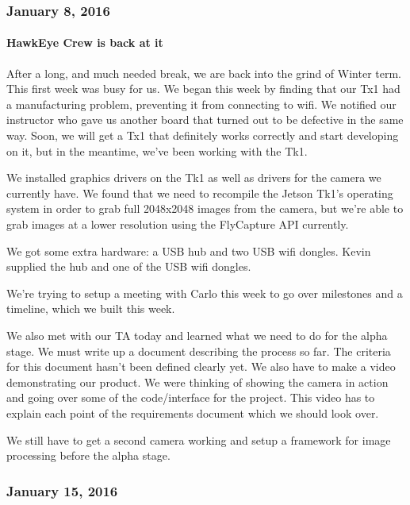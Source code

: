 \subsubsection{January 8, 2016}
\paragraph{HawkEye Crew is back at it}
After a long, and much needed break, we are back into the grind of Winter term. This first week was busy for us. We began this week by finding that our Tx1 had a manufacturing problem, preventing it from connecting to wifi. We notified our instructor who gave us another board that turned out to be defective in the same way. Soon, we will get a Tx1 that definitely works correctly and start developing on it, but in the meantime, we've been working with the Tk1.
\par
We installed graphics drivers on the Tk1 as well as drivers for the camera we currently have. We found that we need to recompile the Jetson Tk1's operating system in order to grab full 2048x2048 images from the camera, but we're able to grab images at a lower resolution using the FlyCapture API currently.
\par
We got some extra hardware: a USB hub and two USB wifi dongles. Kevin supplied the hub and one of the USB wifi dongles.
\par
We're trying to setup a meeting with Carlo this week to go over milestones and a timeline, which we built this week.
\par
We also met with our TA today and learned what we need to do for the alpha stage. We must write up a document describing the process so far. The criteria for this document hasn't been defined clearly yet. We also have to make a video demonstrating our product. We were thinking of showing the camera in action and going over some of the code/interface for the project. This video has to explain each point of the requirements document which we should look over.
\par
We still have to get a second camera working and setup a framework for image processing before the alpha stage.\\

\subsubsection{January 15, 2016}
